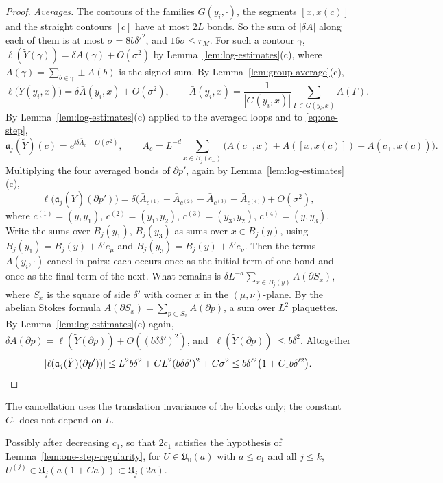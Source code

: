 \begin{proof}
\emph{Averages.} The contours of the families $G(y_i,\cdot)$, the segments $[x,x(c)]$ and the straight contours $[c]$ have at most $2L$ bonds. So the sum of $|\delta A|$ along each of them is at most $\sigma=8b\delta'^2$, and $16\sigma\le r_M$. For such a contour $\gamma$, $\ell(\tilde Y(\gamma))=\delta A(\gamma)+O(\sigma^2)$ by Lemma~\ref{lem:log-estimates}(c), where $A(\gamma)=\sum_{b\in\gamma}\pm A(b)$ is the signed sum. By Lemma~\ref{lem:group-average}(c),
\[
\ell\big(\tilde Y(y_i,x)\big)=\delta\bar A(y_i,x)+O(\sigma^2),\qquad\bar A(y_i,x)=\frac1{|G(y_i,x)|}\sum_{\Gamma\in G(y_i,x)}A(\Gamma).
\]
By Lemma~\ref{lem:log-estimates}(c) applied to the averaged loops and to \eqref{eq:one-step},
\[
\mathfrak a_j(\tilde Y)(c)=e^{\ii\delta\bar A_c+O(\sigma^2)},\qquad\bar A_c=L^{-d}\sum_{x\in B_j(c_-)}\Big(\bar A(c_-,x)+A([x,x(c)])-\bar A(c_+,x(c))\Big).
\]
Multiplying the four averaged bonds of $\partial p'$, again by Lemma~\ref{lem:log-estimates}(c),
\[
\ell\big(\mathfrak a_j(\tilde Y)(\partial p')\big)=\delta\big(\bar A_{c^{(1)}}+\bar A_{c^{(2)}}-\bar A_{c^{(3)}}-\bar A_{c^{(4)}}\big)+O(\sigma^2),
\]
where $c^{(1)}=(y,y_1)$, $c^{(2)}=(y_1,y_2)$, $c^{(3)}=(y_3,y_2)$, $c^{(4)}=(y,y_3)$. Write the sums over $B_j(y_1)$, $B_j(y_3)$ as sums over $x\in B_j(y)$, using $B_j(y_1)=B_j(y)+\delta'e_\mu$ and $B_j(y_3)=B_j(y)+\delta'e_\nu$. Then the terms $\bar A(y_i,\cdot)$ cancel in pairs: each occurs once as the initial term of one bond and once as the final term of the next. What remains is $\delta L^{-d}\sum_{x\in B_j(y)}A(\partial S_x)$, where $S_x$ is the square of side $\delta'$ with corner $x$ in the $(\mu,\nu)$-plane. By the abelian Stokes formula $A(\partial S_x)=\sum_{p\subset S_x}A(\partial p)$, a sum over $L^2$ plaquettes. By Lemma~\ref{lem:log-estimates}(c) again, $\delta A(\partial p)=\ell(\tilde Y(\partial p))+O((b\delta\delta')^2)$, and $|\ell(\tilde Y(\partial p))|\le b\delta^2$. Altogether
\[
|\ell(\mathfrak a_j(\tilde Y)(\partial p'))|\le L^2b\delta^2+CL^2(b\delta\delta')^2+C\sigma^2\le b\delta'^2\big(1+C_1b\delta'^2\big).\qedhere
\]
\end{proof}

The cancellation uses the translation invariance of the blocks only; the constant $C_1$ does not depend on $L$.

\begin{proposition}\label{prop:avg-regular}
Possibly after decreasing $c_1$, so that $2c_1$ satisfies the hypothesis of Lemma~\ref{lem:one-step-regularity}, for $U\in\mathfrak U_0(a)$ with $a\le c_1$ and all $j\le k$, $U^{(j)}\in\mathfrak U_j(a(1+Ca))\subset\mathfrak U_j(2a)$.
\end{proposition}

